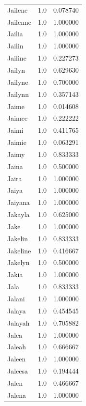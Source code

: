 \documentclass[
  letterpaper,
  DIV=11,
  numbers=noendperiod]{scrreprt}
\begin{document}
\begin{tabular}{lrr}
Jailene         &   1.0 &   0.078740 \\
Jailenne        &   1.0 &   1.000000 \\
Jailia          &   1.0 &   1.000000 \\
Jailin          &   1.0 &   1.000000 \\
Jailine         &   1.0 &   0.227273 \\
Jailyn          &   1.0 &   0.629630 \\
Jailyne         &   1.0 &   0.700000 \\
Jailynn         &   1.0 &   0.357143 \\
Jaime           &   1.0 &   0.014608 \\
Jaimee          &   1.0 &   0.222222 \\
Jaimi           &   1.0 &   0.411765 \\
Jaimie          &   1.0 &   0.063291 \\
Jaimy           &   1.0 &   0.833333 \\
Jaina           &   1.0 &   0.500000 \\
Jaira           &   1.0 &   1.000000 \\
Jaiya           &   1.0 &   1.000000 \\
Jaiyana         &   1.0 &   1.000000 \\
Jakayla         &   1.0 &   0.625000 \\
Jake            &   1.0 &   1.000000 \\
Jakelin         &   1.0 &   0.833333 \\
Jakeline        &   1.0 &   0.416667 \\
Jakelyn         &   1.0 &   0.500000 \\
Jakia           &   1.0 &   1.000000 \\
Jala            &   1.0 &   0.833333 \\
Jalani          &   1.0 &   1.000000 \\
Jalaya          &   1.0 &   0.454545 \\
Jalayah         &   1.0 &   0.705882 \\
Jalea           &   1.0 &   1.000000 \\
Jaleah          &   1.0 &   0.666667 \\
Jaleen          &   1.0 &   1.000000 \\
Jaleesa         &   1.0 &   0.194444 \\
Jalen           &   1.0 &   0.466667 \\
Jalena          &   1.0 &   1.000000 \\

\end{tabular}
\end{document}
